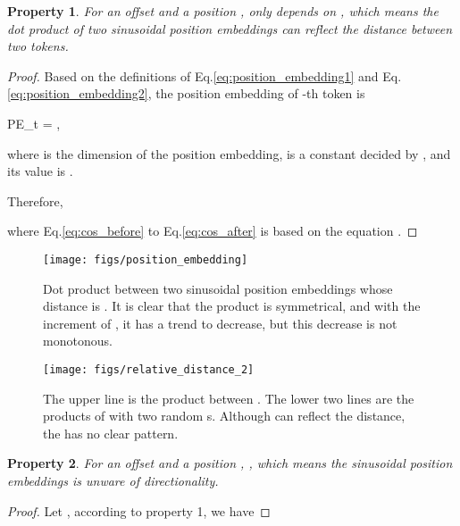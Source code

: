 \documentclass[11pt,a4paper]{article}
\newtheorem{prop}{Property}
\begin{document}
\begin{prop}
  For an offset  and a position ,  only depends on , which means the dot product of two sinusoidal position embeddings can reflect the distance between two tokens.
\end{prop}
\begin{proof}
  Based on the definitions of Eq.\eqref{eq:position_embedding1} and Eq.\eqref{eq:position_embedding2},
the position embedding of -th token is
\begin{seequation}
  PE_t  = ,
\end{seequation}
where  is the dimension of the position embedding,  is a constant decided by , and its value is .

Therefore,

 \vspace{-1em}
{\small

}where Eq.\eqref{eq:cos_before} to Eq.\eqref{eq:cos_after} is based on the equation .
\end{proof}

\begin{figure}[t]
    \centering
    \texttt{[image: figs/position\_embedding]}
    \caption{Dot product between two sinusoidal position embeddings whose distance is . It is clear that the product is symmetrical, and with the increment of , it has a trend to decrease, but this decrease is not monotonous. }\label{fig:position_curve}
\end{figure}

\begin{figure}[t]
    \centering
    \texttt{[image: figs/relative\_distance\_2]}
    \caption{The upper line is the product between . The lower two lines are the products of  with two random s. Although  can reflect the distance, the  has no clear pattern. }\label{fig:position_curve_2}
\end{figure}

\begin{prop}
For an offset  and a position , , which means the sinusoidal position embeddings is unware of directionality.
\end{prop}
\begin{proof}

Let , according to property 1, we have

\vspace{-1em}
{\small

}\end{proof}
\end{document}
